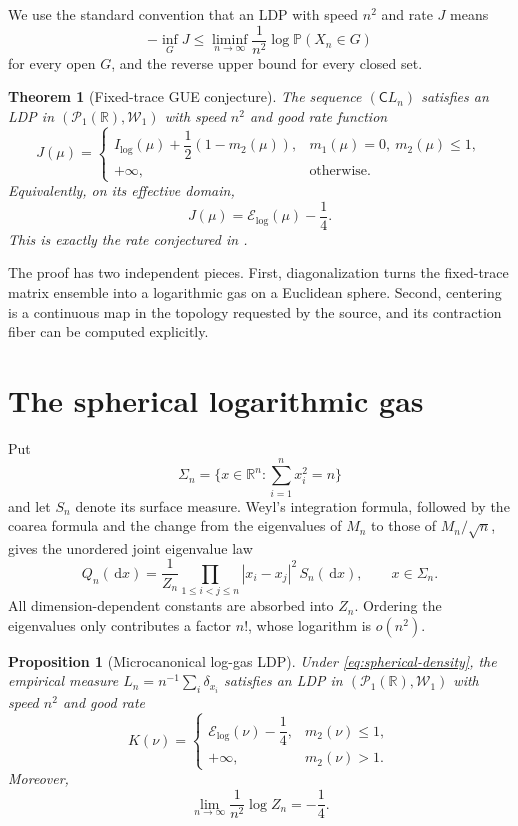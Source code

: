 \documentclass[11pt]{article}
\newtheorem{theorem}{Theorem}
\newtheorem{proposition}{Proposition}
\newcommand{\R}{\mathbb R}
\newcommand{\Pone}{\mathcal P_1(\R)}
\newcommand{\W}{\mathcal W}
\newcommand{\E}{\mathcal E_{\log}}
\newcommand{\dd}{\,\mathrm d}
\begin{document}
We use the standard convention that an LDP with speed $n^2$ and rate $J$
means
\[
 -\inf_{G}J\le \liminf_{n\to\infty}\frac1{n^2}\log\mathbb P(X_n\in G)
\]
for every open $G$, and the reverse upper bound for every closed set.

\begin{theorem}[Fixed-trace GUE conjecture]\label{thm:main}
The sequence $(\mathsf C L_n)$ satisfies an LDP in $(\Pone,\W_1)$ with
speed $n^2$ and good rate function
\[
 J(\mu)=
 \begin{cases}
 I_{\log}(\mu)+\dfrac12(1-m_2(\mu)),
   &m_1(\mu)=0,\ m_2(\mu)\le1,\\[4pt]
 +\infty,&\text{otherwise}.
 \end{cases}
\]
Equivalently, on its effective domain,
\[
 J(\mu)=\E(\mu)-\frac14.
\]
This is exactly the rate conjectured in \cite[p.~35]{CL}.
\end{theorem}

The proof has two independent pieces. First, diagonalization turns the
fixed-trace matrix ensemble into a logarithmic gas on a Euclidean sphere.
Second, centering is a continuous map in the topology requested by the
source, and its contraction fiber can be computed explicitly.

\section{The spherical logarithmic gas}

Put
\[
 \Sigma_n=\Big\{x\in\R^n:\sum_{i=1}^n x_i^2=n\Big\}
\]
and let $S_n$ denote its surface measure. Weyl's integration formula,
followed by the coarea formula and the change from the eigenvalues of $M_n$
to those of $M_n/\sqrt n$, gives the unordered joint eigenvalue law
\begin{equation}\label{eq:spherical-density}
 Q_n(\dd x)=\frac1{Z_n}
 \prod_{1\le i<j\le n}|x_i-x_j|^2\,S_n(\dd x),
 \qquad x\in\Sigma_n.
\end{equation}
All dimension-dependent constants are absorbed into $Z_n$. Ordering the
eigenvalues only contributes a factor $n!$, whose logarithm is $o(n^2)$.

\begin{proposition}[Microcanonical log-gas LDP]\label{prop:micro}
Under \eqref{eq:spherical-density}, the empirical measure
$L_n=n^{-1}\sum_i\delta_{x_i}$ satisfies an LDP in $(\Pone,\W_1)$ with
speed $n^2$ and good rate
\begin{equation}\label{eq:K}
 K(\nu)=
 \begin{cases}
 \E(\nu)-\dfrac14,&m_2(\nu)\le1,\\[3pt]
 +\infty,&m_2(\nu)>1.
 \end{cases}
\end{equation}
Moreover,
\begin{equation}\label{eq:partition}
 \lim_{n\to\infty}\frac1{n^2}\log Z_n=-\frac14.
\end{equation}
\end{proposition}
\end{document}

